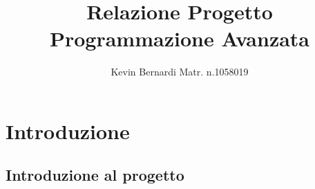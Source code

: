 \documentclass[11pt, ]{article}
\title{Relazione Progetto Programmazione Avanzata}
\author{Kevin Bernardi Matr. n.1058019}
\date{}
\begin{document}
\maketitle
\section{Introduzione}
\subsection{Introduzione al progetto}
\end{document}
